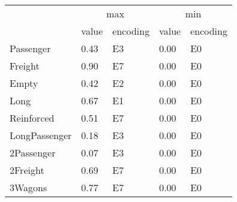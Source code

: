 \begin{tabular}{lllll}
\toprule
 & \multicolumn{2}{c}{max} & \multicolumn{2}{c}{min} \\
 & value & encoding & value & encoding \\
\midrule
Passenger & 0.43 & E3 & 0.00 & E0 \\
Freight & 0.90 & E7 & 0.00 & E0 \\
Empty & 0.42 & E2 & 0.00 & E0 \\
Long & 0.67 & E1 & 0.00 & E0 \\
Reinforced & 0.51 & E7 & 0.00 & E0 \\
LongPassenger & 0.18 & E3 & 0.00 & E0 \\
2Passenger & 0.07 & E3 & 0.00 & E0 \\
2Freight & 0.69 & E7 & 0.00 & E0 \\
3Wagons & 0.77 & E7 & 0.00 & E0 \\
\bottomrule
\end{tabular}
